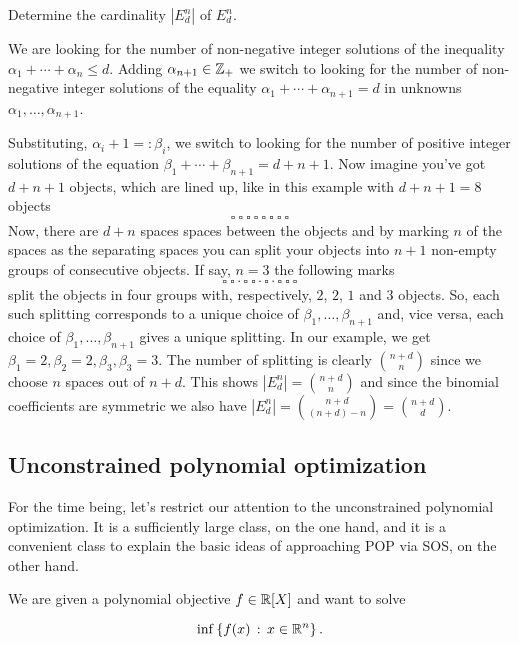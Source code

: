 \begin{exercise}
	Determine the cardinality $|E^n_d|$ of $E^n_d$.
\end{exercise}
\begin{solution}
	We are looking for the number of non-negative integer solutions of the inequality $\alpha_1 + \cdots + \alpha_n \le d$.  Adding $\alpha_{n+1} \in \mathbb{Z}_+$ we switch to looking for the number of non-negative integer solutions of the equality  $\alpha_1 + \cdots + \alpha_{n+1} = d$ in unknowns $\alpha_1,\ldots,\alpha_{n+1}$. 
		
	Substituting, $\alpha_i + 1 =: \beta_i$, we switch to looking for the number of positive integer solutions of the equation $\beta_1 + \cdots + \beta_{n+1} = d+n+1$. Now imagine you've got $d+n+1$ objects, which are lined up, like in this example with $d+n+1 = 8$ objects
	\[
		\square \ \square \ \square \ \square \ \square \ \square \ \square \  \square 
	\]
	Now, there are $d+n$ spaces spaces between the objects and by marking $n$ of the spaces as the separating spaces you can split your objects into $n+1$ non-empty groups of consecutive objects. If say, $n=3$ the following marks
	\[
	\square \ \square \cdot \square \ \square \cdot \square \cdot \square \ \square \  \square 
	\]
	split the objects in four groups with, respectively, $2$, $2$, $1$ and $3$ objects. So, each such splitting corresponds to a unique choice of $\beta_1,\ldots,\beta_{n+1}$ and, vice versa, each choice of $\beta_1,\ldots,\beta_{n+1}$ gives a unique splitting. In our example, we get $\beta_1 = 2, \beta_2 =2,\beta_3, \beta_3=3$. The number of splitting is clearly $\binom{n+d}{n}$ since we choose $n$ spaces out of $n+d$. This shows $|E_d^n| = \binom{n+d}{n}$ and since the binomial coefficients are symmetric we also have $|E_d^n|  = \binom{n+d}{(n+d)-n} = \binom{n+d}{d}$. 
\end{solution}

\subsection{Unconstrained polynomial optimization}

For the time being, let's restrict our attention to the unconstrained polynomial optimization. It is a sufficiently large class, on the one hand, and it is a convenient class to explain the basic ideas of approaching POP via SOS, on the other hand. 

We are given a polynomial objective $f \in \mathbb{R}[X]$ and want to solve 

\begin{equation}
	\inf \left\{ f(x) \,:\, x \in \mathbb{R}^n \right\}. \label{unconst:POP:eq}
\end{equation}

